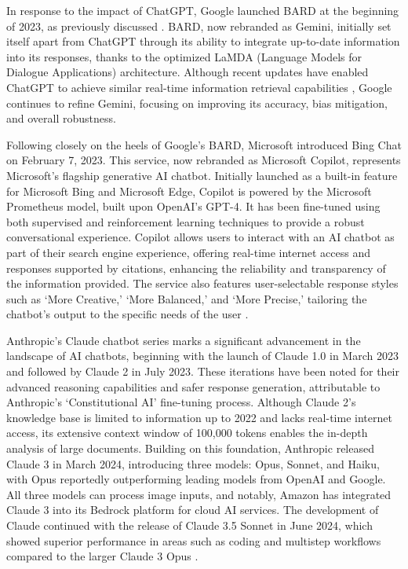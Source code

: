 In response to the impact of ChatGPT, Google launched BARD at the beginning of 2023, as previously discussed \cite{wikipedia2024gemini}. BARD, now rebranded as Gemini, initially set itself apart from ChatGPT through its ability to integrate up-to-date information into its responses, thanks to the optimized LaMDA (Language Models for Dialogue Applications) architecture. Although recent updates have enabled ChatGPT to achieve similar real-time information retrieval capabilities \cite{aljazeera2023chatgpt}, Google continues to refine Gemini, focusing on improving its accuracy, bias mitigation, and overall robustness.

Following closely on the heels of Google’s BARD, Microsoft introduced Bing Chat on February 7, 2023. This service, now rebranded as Microsoft Copilot, represents Microsoft’s flagship generative AI chatbot. Initially launched as a built-in feature for Microsoft Bing and Microsoft Edge, Copilot is powered by the Microsoft Prometheus model, built upon OpenAI’s GPT-4. It has been fine-tuned using both supervised and reinforcement learning techniques to provide a robust conversational experience. Copilot allows users to interact with an AI chatbot as part of their search engine experience, offering real-time internet access and responses supported by citations, enhancing the reliability and transparency of the information provided. The service also features user-selectable response styles such as ‘More Creative,’ ‘More Balanced,’ and ‘More Precise,’ tailoring the chatbot’s output to the specific needs of the user \cite{microsoft2024copilot, wikipedia2023copilot}.

Anthropic’s Claude chatbot series marks a significant advancement in the landscape of AI chatbots, beginning with the launch of Claude 1.0 in March 2023 and followed by Claude 2 in July 2023. These iterations have been noted for their advanced reasoning capabilities and safer response generation, attributable to Anthropic’s ‘Constitutional AI’ fine-tuning process. Although Claude 2’s knowledge base is limited to information up to 2022 and lacks real-time internet access, its extensive context window of 100,000 tokens enables the in-depth analysis of large documents. Building on this foundation, Anthropic released Claude 3 in March 2024, introducing three models: Opus, Sonnet, and Haiku, with Opus reportedly outperforming leading models from OpenAI and Google. All three models can process image inputs, and notably, Amazon has integrated Claude 3 into its Bedrock platform for cloud AI services. The development of Claude continued with the release of Claude 3.5 Sonnet in June 2024, which showed superior performance in areas such as coding and multistep workflows compared to the larger Claude 3 Opus \cite{wikipedia2024anthropic}.

